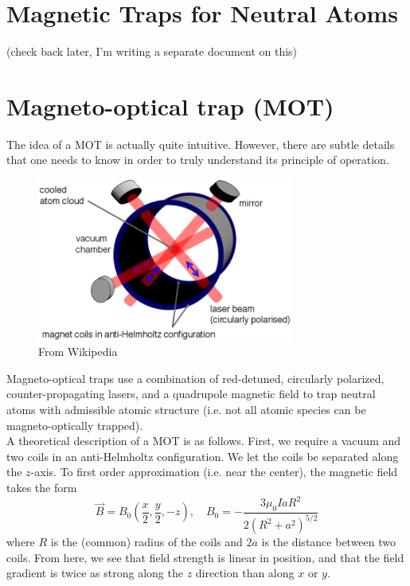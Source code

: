 \documentclass{book}
\theoremstyle{definition}
\newcommand{\f}[2]{\frac{#1}{#2}}
\newcommand{\lp}{\left(}
\newcommand{\rp}{\right)}
\begin{document}



\section{Magnetic Traps for Neutral Atoms}

(check back later, I'm writing a separate document on this)


\section*{Magneto-optical trap (MOT)} 

The idea of a MOT is actually quite intuitive. However, there are subtle details that one needs to know in order to truly understand its principle of operation. 

\begin{figure}[!htb]
	\centering
	\includegraphics[width=0.75\textwidth]{images/MOT}
	\caption{From Wikipedia}
\end{figure}

Magneto-optical traps use a combination of red-detuned, circularly polarized, counter-propagating lasers, and a quadrupole magnetic field to trap neutral atoms with admissible atomic structure (i.e. not all atomic species can be magneto-optically trapped). \\


A theoretical description of a MOT is as follows. First, we require a vacuum and two coils in an anti-Helmholtz configuration. We let the coils be separated along the $z$-axis. To first order approximation (i.e. near the center), the magnetic field takes the form
\begin{equation*}
\vec{B} = B_0 \lp \f{x}{2}, \f{y}{2}, -z \rp, \quad B_0 = -\f{3\mu_0 I a R^2}{2(R^2 + a^2)^{5/2}}
\end{equation*}
where $R$ is the (common) radius of the coils and $2a$ is the distance between two coils. From here, we see that field strength is linear in position, and that the field gradient is twice as strong along the $z$ direction than along $x$ or $y$. 
\end{document}
